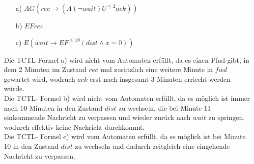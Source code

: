 

\begin{itemize}
	\item[a)] $AG(rec \rightarrow (A(\neg wait)U^{\leq2} ack))$ 
	\item[b)] $EF rec$
	\item[c)] $E(wait \rightarrow EF^{\leq 10}(dist \wedge x=0))$	
\end{itemize}

Die TCTL Formel a) wird nicht vom Automaten erfüllt, da es einen Pfad gibt, in dem 2 Minuten im Zustand $rec$ und zusätzlich eine weitere Minute in $fwd$ gewartet wird, wodruch $ack$ erst nach insgesamt 3 Minuten erriecht werden würde. \\

Die TCTL- Formel b) wird nicht vom Automaten erfüllt, da es möglich ist immer nach 10 Minuten in den Zustand $dist$ zu wechseln, die bei Minute 11 einkommende Nachricht zu verpassen und wieder zurück nach $wait$ zu springen, wodurch effektiv keine Nachricht durchkommt. \\

Die TCTL- Formel c) wird vom Automaten erfüllt, da es möglich ist bei Minute 10 in den Zustand $dist$ zu wechseln und dadurch zeitgleich eine eingehende Nachricht zu verpassen.

